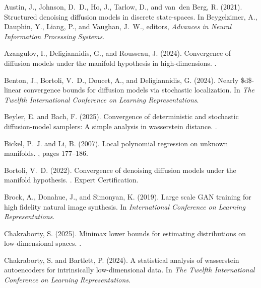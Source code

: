 \documentclass[12pts]{article}
\begin{document}
\begin{thebibliography}{}

Austin, J., Johnson, D.~D., Ho, J., Tarlow, D., and van~den Berg, R. (2021).
\newblock Structured denoising diffusion models in discrete state-spaces.
\newblock In Beygelzimer, A., Dauphin, Y., Liang, P., and Vaughan, J.~W., editors, {\em Advances in Neural Information Processing Systems}.

Azangulov, I., Deligiannidis, G., and Rousseau, J. (2024).
\newblock Convergence of diffusion models under the manifold hypothesis in high-dimensions.
.

Benton, J., Bortoli, V.~D., Doucet, A., and Deligiannidis, G. (2024).
\newblock Nearly \$d\$-linear convergence bounds for diffusion models via stochastic localization.
\newblock In {\em The Twelfth International Conference on Learning Representations}.

Beyler, E. and Bach, F. (2025).
\newblock Convergence of deterministic and stochastic diffusion-model samplers: A simple analysis in wasserstein distance.
.

Bickel, P.~J. and Li, B. (2007).
\newblock Local polynomial regression on unknown manifolds.
, pages 177--186.

Bortoli, V.~D. (2022).
\newblock Convergence of denoising diffusion models under the manifold hypothesis.
.
\newblock Expert Certification.

Brock, A., Donahue, J., and Simonyan, K. (2019).
\newblock Large scale {GAN} training for high fidelity natural image synthesis.
\newblock In {\em International Conference on Learning Representations}.

Chakraborty, S. (2025).
\newblock Minimax lower bounds for estimating distributions on low-dimensional spaces.
.

Chakraborty, S. and Bartlett, P. (2024).
\newblock A statistical analysis of wasserstein autoencoders for intrinsically low-dimensional data.
\newblock In {\em The Twelfth International Conference on Learning Representations}.


\end{thebibliography}
\end{document}
